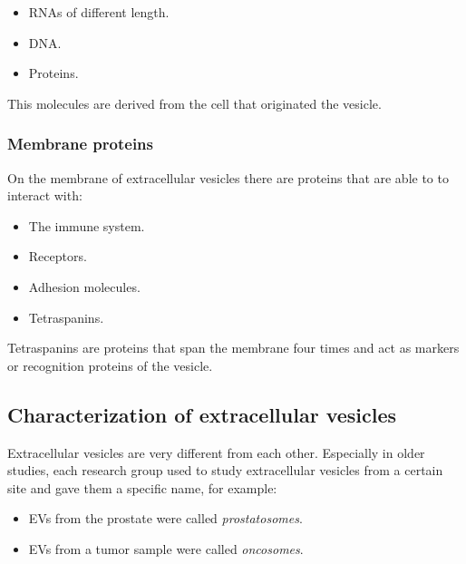         \begin{multicols}{3}
            \begin{itemize}
                \item RNAs of different length.
                \item DNA.
                \item Proteins.
            \end{itemize}
        \end{multicols}

        This molecules are derived from the cell that originated the vesicle.

        \subsubsection{Membrane proteins}
        On the membrane of extracellular vesicles there are proteins that are able to to interact with:

        \begin{multicols}{4}
            \begin{itemize}
                \item The immune system.
                \item Receptors.
                \item Adhesion molecules.
                \item Tetraspanins.
            \end{itemize}
        \end{multicols}

        Tetraspanins are proteins that span the membrane four times and act as markers or recognition proteins of the vesicle.

    \subsection{Characterization of extracellular vesicles}
    Extracellular vesicles are very different from each other.
    Especially in older studies, each research group used to study extracellular vesicles from a certain site and gave them a specific name, for example:

    \begin{multicols}{2}
        \begin{itemize}
            \item EVs from the prostate were called \textit{prostatosomes}.
            \item EVs from a tumor sample were called \textit{oncosomes}.
        \end{itemize}
    \end{multicols}

